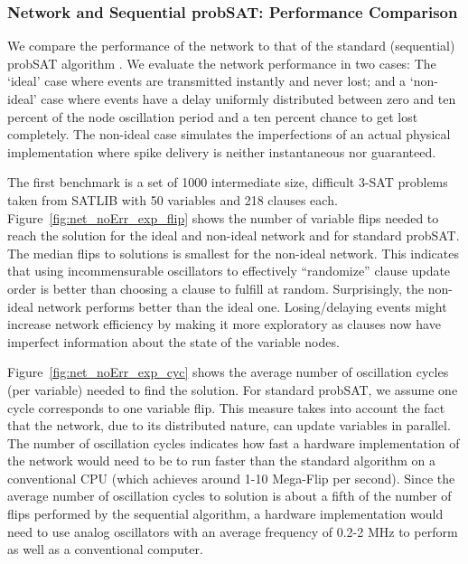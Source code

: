 \documentclass[10pt]{article}
\begin{document}
\subsubsection*{Network and Sequential probSAT: Performance Comparison}
We compare the performance of the network to that of the standard (sequential) probSAT algorithm \cite{Balint_Schoning12}. We evaluate the network performance in two cases: The `ideal' case where events are transmitted instantly and never lost; and a `non-ideal' case where events have a delay uniformly distributed between zero and ten percent of the node oscillation period and a ten percent chance to get lost completely. The non-ideal case simulates the imperfections of an actual physical implementation where spike delivery is neither instantaneous nor guaranteed.

The first benchmark is a set of 1000 intermediate size, difficult 3-SAT problems taken from SATLIB \cite{Hoos_Stutzle98} with 50 variables and 218 clauses each. Figure~\ref{fig:net_noErr_exp_flip} shows the number of variable flips needed to reach the solution for the ideal and non-ideal network and for standard probSAT. The median flips to solutions is smallest for the non-ideal network. 
This indicates that using incommensurable oscillators to effectively ``randomize'' clause update order is better than choosing a clause to fulfill at random. 
Surprisingly, the non-ideal network performs better than the ideal one. Losing/delaying events might increase network efficiency by making it more exploratory as clauses now have imperfect information about the state of the variable nodes.

Figure~\ref{fig:net_noErr_exp_cyc} shows the average number of oscillation cycles (per variable) needed to find the solution. For standard probSAT, we assume one cycle corresponds to one variable flip. This measure takes into account the fact that the network, due to its distributed nature, can update variables in parallel. The number of oscillation cycles indicates how fast a hardware implementation of the network would need to be to run faster than the standard algorithm on a conventional CPU (which achieves around 1-10 Mega-Flip per second). Since the average number of oscillation cycles to solution is about a fifth of the number of flips performed by the sequential algorithm, a hardware implementation would need to use analog oscillators with an average frequency of 0.2-2 MHz to perform as well as a conventional computer. 
\end{document}
